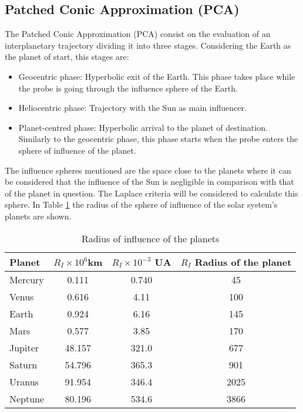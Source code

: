\subsection{Patched Conic Approximation (PCA)}
The Patched Conic Approximation (PCA) consist on the evaluation of an interplanetary trajectory dividing it into three stages. Considering the Earth as the planet of start, this stages are: 
\begin{itemize}
\item Geocentric phase: Hyperbolic exit of the Earth. This phase takes place while the probe is going through the influence sphere of the Earth. 
\item Heliocentric phase: Trajectory with the Sun as main influencer.
\item Planet-centred phase: Hyperbolic arrival to the planet of destination. Similarly to the geocentric phase, this phase starts when the probe enters the sphere of influence of the planet. 
\end{itemize}
The influence spheres mentioned are the space close to the planets where it can be considered that the influence of the Sun is negligible in comparison with that of the planet in question. The Laplace criteria will be considered to calculate this sphere. In Table \ref{RIplanets} the radius of the sphere of influence of the solar system's planets are shown. 
\begin{table}[H]
\centering
\begin{tabular}{|lccc|}
\hline
Planet  & $R_I\times 10^6 $km & $R_I\times 10^{-3} $ UA & $R_I$ Radius of the planet \\ \hline
Mercury & 0.111                       & 0.740                        & 45                     \\
Venus   & 0.616                       & 4.11                         & 100                    \\
Earth   & 0.924                       & 6.16                         & 145                    \\
Mars    & 0.577                       & 3.85                         & 170                    \\
Jupiter & 48.157                      & 321.0                        & 677                    \\
Saturn  & 54.796                      & 365.3                        & 901                    \\
Uranus  & 91.954                      & 346.4                        & 2025                   \\
Neptune & 80.196                      & 534.6                        & 3866                   \\ \hline
\end{tabular}
\caption{Radius of influence of the planets}
\label{RIplanets}
\end{table}
